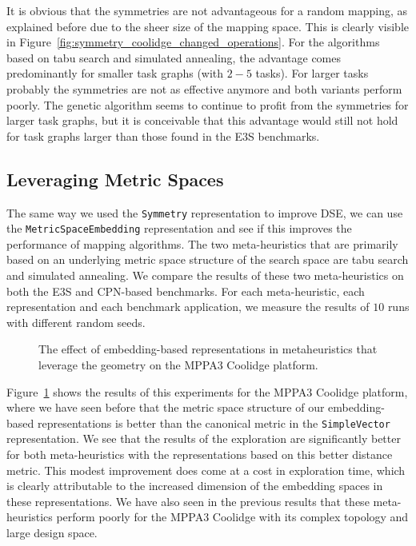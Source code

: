 It is obvious that the symmetries are not advantageous for a random mapping, as explained before due to the sheer size of the mapping space.
This is clearly visible in Figure~\ref{fig:symmetry_coolidge_changed_operations}.
For the algorithms based on tabu search and simulated annealing, the advantage comes predominantly for smaller task graphs (with $2-5$ tasks).
For larger tasks probably the symmetries are not as effective anymore and both variants perform poorly. 
The genetic algorithm seems to continue to profit from the symmetries for larger task graphs, but it is conceivable that this advantage would still not hold for task graphs larger than those found in the \ac{E3S} benchmarks.

\subsection{Leveraging Metric Spaces}

The same way we used the \texttt{Symmetry} representation to improve \ac{DSE}, we can use the \texttt{MetricSpaceEmbedding} representation and see if this improves the performance of mapping algorithms.
The two meta-heuristics that are primarily based on an underlying metric space structure of the search space are tabu search and simulated annealing.
We compare the results of these two meta-heuristics on both the \ac{E3S} and \ac{CPN}-based benchmarks.
For each meta-heuristic, each representation and each benchmark application, we measure the results of $10$ runs with different random seeds.

\begin{figure}[h]
	\centering
   \resizebox{0.95\textwidth}{!}{}
	\caption{The effect of embedding-based representations in metaheuristics that leverage the geometry on the MPPA3 Coolidge platform.}
	\label{fig:coolidge_geometric}
\end{figure}

Figure~\ref{fig:coolidge_geometric} shows the results of this experiments for the MPPA3 Coolidge platform, where we have seen before that the metric space structure of our embedding-based representations is better than the canonical metric in the \texttt{SimpleVector} representation.
We see that the results of the exploration are significantly better for both meta-heuristics with the representations based on this better distance metric.
This modest improvement does come at a cost in exploration time, which is clearly attributable to the increased dimension of the embedding spaces in these representations.
We have also seen in the previous results that these meta-heuristics perform poorly for the MPPA3 Coolidge with its complex topology and large design space.

